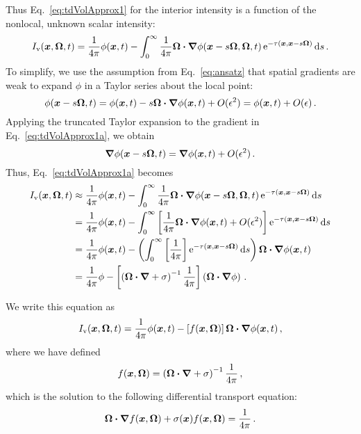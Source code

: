 Thus Eq.~\eqref{eq:tdVolApprox1} for the interior intensity is a function of the
nonlocal, unknown scalar intensity:
\begin{equation}\label{eq:tdVolApprox1a}
  I_\mathrm{v}(\bm{x},\bm{\Omega},t) = \frac{1}{4\pi} \phi(\bm{x},t) - 
     \int_{0}^{\infty}
    \frac{1}{4\pi} \bm{\Omega}\bm{\cdot} \bm{\nabla} \phi(\bm{x} - s \bm{\Omega}, \bm{\Omega}, t)
    \mathop{}\!\mathrm{e}^{ -\tau(\bm{x}, \bm{x} - s \bm{\Omega})}
    \mathop{}\!\mathrm{d} s \,.
\end{equation}
To simplify, we use the assumption from Eq.~\eqref{eq:ansatz} that spatial
gradients are weak to expand $\phi$ in a Taylor series about the local
point:
\begin{equation} \label{eq:taylorPhi}
  \phi(\bm{x} - s \bm{\Omega}, t)
  = \phi(\bm{x},t) - s\bm{\Omega} \bm{\cdot}
  \bm{\nabla}\phi (\bm{x}, t) + O(\epsilon^2) = \phi(\bm{x},t) +
  O(\epsilon) \,.
\end{equation}
Applying the truncated Taylor expansion to the gradient in
Eq.~\eqref{eq:tdVolApprox1a}, we obtain
\begin{equation*}
  \bm{\nabla} \phi(\bm{x}-s\bm{\Omega},t)
  = \bm{\nabla} \phi(\bm{x},t) + O(\epsilon^2)\,.
\end{equation*}
Thus, Eq.~\eqref{eq:tdVolApprox1a} becomes
\begin{align*}\nonumber
  I_\mathrm{v}(\bm{x},\bm{\Omega},t) &\approx \frac{1}{4\pi} \phi(\bm{x},t) - 
     \int_{0}^{\infty}
    \frac{1}{4\pi} \bm{\Omega}\bm{\cdot} \bm{\nabla} \phi(\bm{x} - s \bm{\Omega}, \bm{\Omega}, t)
    \mathop{}\!\mathrm{e}^{ -\tau(\bm{x}, \bm{x} - s \bm{\Omega})}
    \mathop{}\!\mathrm{d} s
\\
  &= \frac{1}{4\pi} \phi(\bm{x},t) - \int_{0}^{\infty}
    \left[ \frac1{4\pi}\bm{\Omega}\bm{\cdot} \bm{\nabla} \phi(\bm{x},t) + O(\epsilon^2) \right]
    \mathop{}\!\mathrm{e}^{ -\tau(\bm{x}, \bm{x} - s \bm{\Omega})}
    \mathop{}\!\mathrm{d} s
  \\ \nonumber
  &= \frac{1}{4\pi} \phi (\bm{x},t) - \left( \int_{0}^{\infty}
    \left[ \frac1{4\pi}\right]
    \mathop{}\!\mathrm{e}^{ -\tau(\bm{x}, \bm{x} - s \bm{\Omega})} \mathop{}\!\mathrm{d} s \right)
    \bm{\Omega}\bm{\cdot} \bm{\nabla} \phi(\bm{x},t)
  \\
  &= \frac{1}{4\pi} \phi - 
  \left[\left(\bm{\Omega}\bm{\cdot} \bm{\nabla}  + \sigma \right)^{-1}
   \frac{1}{4\pi}\right] \left( \bm{\Omega}\bm{\cdot} \bm{\nabla} \phi \right) \,.
\end{align*}

We write this equation as
\begin{equation}\label{eq:tdVolApprox2}
  I_\mathrm{v}(\bm{x},\bm{\Omega},t)
  = \frac{1}{4\pi} \phi (\bm{x},t)
  - \left[ f(\bm{x}, \bm{\Omega}) \right] \bm{\Omega}\bm{\cdot} \bm{\nabla} \phi(\bm{x},t)\,,
\end{equation}
where we have defined
\begin{equation*}
  f(\bm{x},\bm{\Omega}) = \left(\bm{\Omega}\bm{\cdot} \bm{\nabla}  + \sigma \right)^{-1}
  \frac{1}{4\pi} \,,
\end{equation*}
which is the solution to the following differential transport equation:
\begin{equation} \label{eq:fVol}
  \bm{\Omega}\bm{\cdot} \bm{\nabla} f(\bm{x}, \bm{\Omega})
  + \sigma(\bm{x}) f (\bm{x}, \bm{\Omega})
= \frac{1}{4\pi} \,.
\end{equation}

